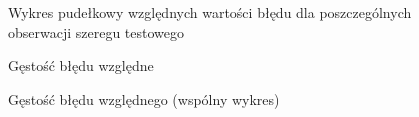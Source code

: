 \documentclass[11pt]{report}
\begin{document}
\begin{figure}
    \centering
    \begin{subfigure}[b]{0.3\textwidth}
        \centering
        \def\svgwidth{\columnwidth}
        
    \end{subfigure}
    \begin{subfigure}[b]{0.3\textwidth}
        \centering
        \def\svgwidth{\columnwidth}
        
    \end{subfigure}
    \begin{subfigure}[b]{0.3\textwidth}
        \centering
        \def\svgwidth{\columnwidth}
        
    \end{subfigure}
     \caption{Wykres pudełkowy względnych wartości błędu dla poszczególnych obserwacji szeregu testowego}
\end{figure}

\begin{figure}
    \centering
    \begin{subfigure}[b]{0.3\textwidth}
        \centering
        \def\svgwidth{\columnwidth}
        
    \end{subfigure}
    \begin{subfigure}[b]{0.3\textwidth}
        \centering
        \def\svgwidth{\columnwidth}
        
    \end{subfigure}
    \begin{subfigure}[b]{0.3\textwidth}
        \centering
        \def\svgwidth{\columnwidth}
        
    \end{subfigure}
     \caption{Gęstość błędu względne}
\end{figure}

\begin{figure}
    \centering
    \centering
    \def\svgwidth{\columnwidth}
    
    \caption{Gęstość błędu względnego (wspólny wykres)}
\end{figure}



\end{document}
